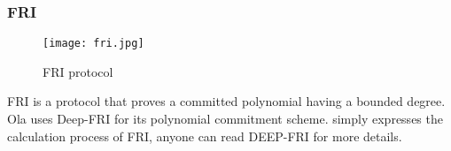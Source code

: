 \subsubsection{FRI}\label{section: starky-fri}

\begin{figure}[!htp]
    \centering
    \texttt{[image: fri.jpg]}
    \caption{FRI protocol}
    \label{fig: FRI}
\end{figure}

FRI is a protocol that proves a committed polynomial having a bounded degree. Ola uses Deep-FRI for its polynomial commitment scheme.  simply expresses the calculation process of FRI, anyone can read DEEP-FRI \cite{cryptoeprint:2019/336} for more details.
